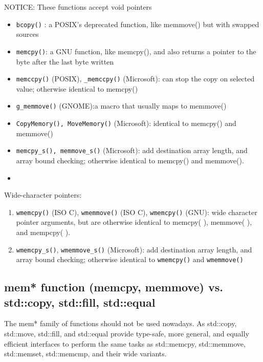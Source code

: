 NOTICE: These functions accept void pointers
\begin{itemize}
  \item \verb!bcopy()! : a POSIX's deprecated function, like memmove() but with
  swapped sources
  
  \item \verb!memcpy()!: a GNU function, like memcpy(), and also returns a
  pointer to the byte after the last byte written
  
  \item \verb!memccpy()! (POSIX), \verb!_memccpy()! (Microsoft): can stop the
  copy on selected value; otherwise identical to memcpy()
  
  \item \verb!g_memmove()! (GNOME):a macro that usually maps to memmove()
  
  \item \verb!CopyMemory(), MoveMemory()! (Microsoft): identical to memcpy() and
  memmove()
  
  \item \verb!memcpy_s(), memmove_s()! (Microsoft): add destination array
  length, and array bound checking; otherwise identical to memcpy() and
  memmove().
  
  \item 
\end{itemize}

Wide-character pointers:
\begin{enumerate}
  \item \verb!wmemcpy()! (ISO C), \verb!wmemmove()! (ISO C), \verb!wmemcpy()!
  (GNU): wide character pointer arguments, but are otherwise identical to
  memcpy( ), memmove( ), and mempcpy( ).
  
  \item \verb!wmemcpy_s()!, \verb!wmemmove_s()! (Microsoft): add destination array
  length, and array bound checking; otherwise identical to \verb!wmemcpy()! and
  \verb!wmemmove()!
  
\end{enumerate}

\subsection{mem* function (memcpy, memmove) vs. std::copy, std::fill,
std::equal}

The mem* family of functions should not be used nowadays.
As std::copy, std::move, std::fill, and std::equal provide type-safe, more
general, and equally efficient interfaces to perform the same tasks as
std::memcpy, std::memmove, std::memset, std::memcmp, and their wide variants.

